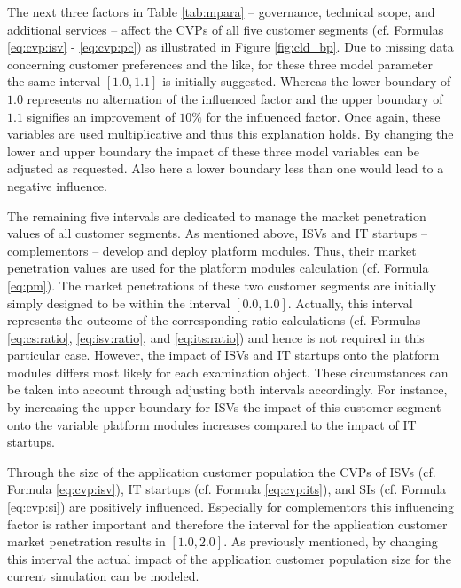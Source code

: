 The next three factors in Table \ref{tab:mpara} -- governance, technical scope, and additional services -- affect the \acp{CVP} of all five customer segments (cf. Formulas \ref{eq:cvp:isv} - \ref{eq:cvp:pc}) as illustrated in Figure \ref{fig:cld_bp}. Due to missing data concerning customer preferences and the like, for these three model parameter the same interval $[1.0,1.1]$ is initially suggested. Whereas the lower boundary of $1.0$ represents no alternation of the influenced factor and the upper boundary of $1.1$ signifies an improvement of $10\%$ for the influenced factor. Once again, these variables are used multiplicative and thus this explanation holds. By changing the lower and upper boundary the impact of these three model variables can be adjusted as requested. Also here a lower boundary less than one would lead to a negative influence.

The remaining five intervals are dedicated to manage the market penetration values of all customer segments. As mentioned above, \acp{ISV} and \ac{IT} startups -- complementors -- develop and deploy platform modules. Thus, their market penetration values are used for the platform modules calculation (cf. Formula \ref{eq:pm}). The market penetrations of these two customer segments are initially simply designed to be within the interval $[0.0,1.0]$. Actually, this interval represents the outcome of the corresponding ratio calculations (cf. Formulas \ref{eq:cs:ratio}, \ref{eq:isv:ratio}, and \ref{eq:its:ratio}) and hence is not required in this particular case. However, the impact of \acp{ISV} and \ac{IT} startups onto the platform modules differs most likely for each examination object. These circumstances can be taken into account through adjusting both intervals accordingly. For instance, by increasing the upper boundary for \acp{ISV} the impact of this customer segment onto the variable platform modules increases compared to the impact of \ac{IT} startups.

Through the size of the application customer population the \acp{CVP} of \acp{ISV} (cf. Formula \ref{eq:cvp:isv}), \ac{IT} startups (cf. Formula \ref{eq:cvp:its}), and \acp{SI} (cf. Formula \ref{eq:cvp:si}) are positively influenced. Especially for complementors this influencing factor is rather important and therefore the interval for the application customer market penetration results in $[1.0,2.0]$. As previously mentioned, by changing this interval the actual impact of the application customer population size for the current simulation can be modeled.

